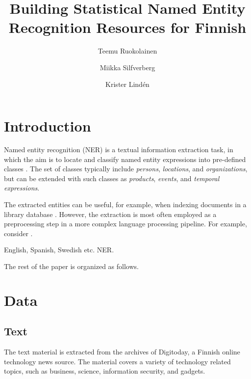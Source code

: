\documentclass[11pt]{article}
\begin{document}
\title{Building Statistical Named Entity Recognition Resources for Finnish}
\author{Teemu Ruokolainen \and Miikka Silfverberg \and Krister Lind\'en}



\maketitle


\begin{abstract}
\noindent 

\end{abstract}

\section{Introduction}
\label{sec: introduction}

Named entity recognition (NER) is a textual information extraction task, in which the aim is to locate and classify named entity expressions into pre-defined classes \citep{}. The set of classes typically include \textit{persons}, \textit{locations}, and \textit{organizations}, but can be extended with such classes as \textit{products}, \textit{events}, and \textit{temporal expressions}. 

The extracted entities can be useful, for example, when indexing documents in a library database \citep{}. However, the extraction is most often employed as a preprocessing step in a more complex language processing pipeline. For example, consider .

English, Spanish, Swedish etc. NER. 

The rest of the paper is organized as follows.




\section{Data}
\label{sec: data}

\subsection{Text}

The text material is extracted from the archives of Digitoday, a Finnish online technology news source. The material covers a variety of technology related topics, such as business, science, information security, and gadgets.  

\end{document}
